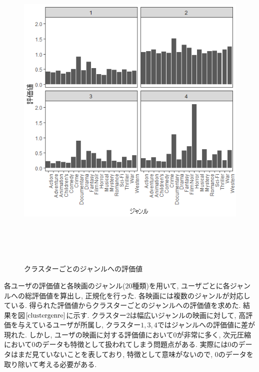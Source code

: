 \documentclass[a4j,12pt]{jarticle}
\begin{document}
\begin{figure}[tbp]
\begin{center}
\includegraphics[clip,height= 160mm]{data/cluster_plot.png}
\end{center}
 \vspace{-0.9cm}
\caption{クラスターごとのジャンルへの評価値}
\label{clustergenre}
\end{figure}

各ユーザの評価値と各映画のジャンル($20$種類)を用いて, ユーザごとに各ジャンルへの総評価値を算出し, 正規化を行った. 各映画には複数のジャンルが対応している. 得られた評価値からクラスターごとのジャンルへの評価値を求めた. 結果を図$\ref{clustergenre}$に示す. クラスター$2$は幅広いジャンルの映画に対して, 高評価を与えているユーザが所属し, クラスター$1,3,4$ではジャンルへの評価値に差が現れた. しかし, ユーザの映画に対する評価値において$0$が非常に多く, 次元圧縮において$0$のデータも特徴として扱われてしまう問題点がある. 実際には$0$のデータはまだ見ていないことを表しており, 特徴として意味がないので, $0$のデータを取り除いて考える必要がある.

\end{document}
